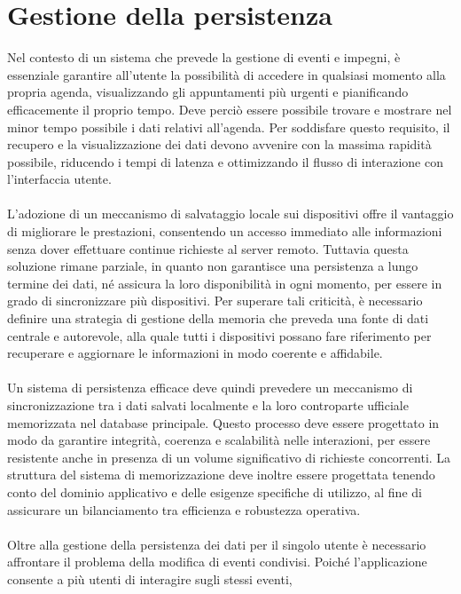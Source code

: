 \chapter{Gestione della persistenza}

Nel contesto di un sistema che prevede la gestione di eventi e impegni,
è essenziale garantire all'utente la possibilità 
di accedere in qualsiasi momento alla propria agenda,
visualizzando gli appuntamenti più urgenti e pianificando efficacemente il proprio tempo.
Deve perciò essere possibile trovare e mostrare
nel minor tempo possibile i dati relativi all'agenda.
Per soddisfare questo requisito,
il recupero e la visualizzazione dei dati devono avvenire con la massima rapidità possibile,
riducendo i tempi di latenza e ottimizzando il flusso di interazione con l'interfaccia utente.\\
\\
L'adozione di un meccanismo di salvataggio locale sui dispositivi
offre il vantaggio di migliorare le prestazioni,
consentendo un accesso immediato alle informazioni
senza dover effettuare continue richieste al server remoto.
Tuttavia questa soluzione rimane parziale,
in quanto non garantisce una persistenza a lungo termine dei dati,
né assicura la loro disponibilità in ogni momento,
per essere in grado di sincronizzare più dispositivi.
Per superare tali criticità,
è necessario definire una strategia di gestione della memoria
che preveda una fonte di dati centrale e autorevole,
alla quale tutti i dispositivi possano fare riferimento per recuperare e
aggiornare le informazioni in modo coerente e affidabile.\\
\\
Un sistema di persistenza efficace deve quindi prevedere
un meccanismo di sincronizzazione tra i dati salvati localmente e
la loro controparte ufficiale memorizzata nel database principale.
Questo processo deve essere progettato in modo da garantire
integrità, coerenza e scalabilità nelle interazioni,
per essere resistente anche in presenza di un volume significativo di richieste concorrenti.
La struttura del sistema di memorizzazione deve inoltre essere progettata
tenendo conto del dominio applicativo e delle esigenze specifiche di utilizzo,
al fine di assicurare un bilanciamento tra efficienza e robustezza operativa.\\
\\
Oltre alla gestione della persistenza dei dati per il singolo utente
è necessario affrontare il problema della modifica di eventi condivisi.
Poiché l'applicazione consente a più utenti di interagire sugli stessi eventi,
